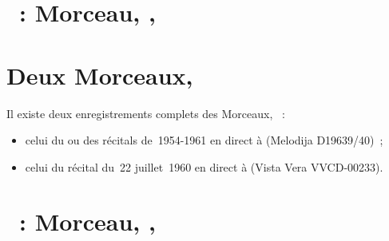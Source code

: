\section{\ifChrono \Scriabine{}~: \fi
Morceau,  , }
\label{\thesection}

\begin{workitemize}
 \item{}
 \begin{perfitemize}
  \item\NoEdition{}
 \end{perfitemize}
\end{workitemize}

\section*{%
Deux Morceaux, }

Il existe deux enregistrements complets des Morceaux, ~:
\begin{itemize}
 \item
 celui du ou des récitals de~1954-1961 en direct à \MSHM (Melodija
 D19639/40)~;
 \item
 celui du récital du~22 juillet~1960 en direct à \MSHM (Vista Vera
 VVCD-00233).
\end{itemize}

\section{\ifChrono \Scriabine{}~: \fi
Morceau,  , }
\label{\thesection}

